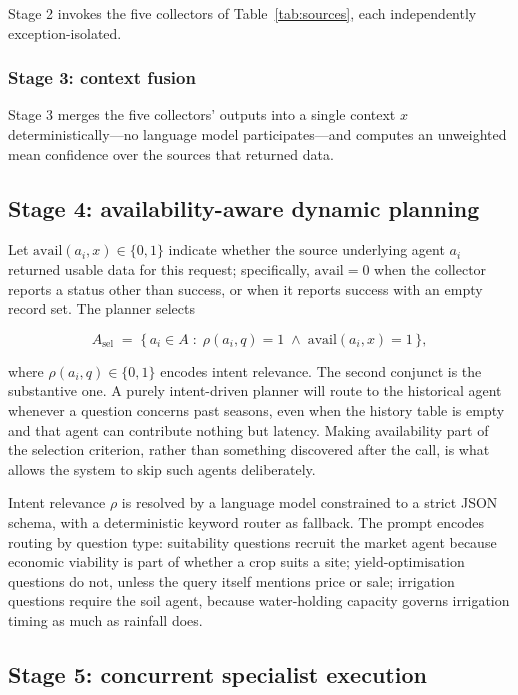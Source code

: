 \documentclass[preprint,12pt]{elsarticle}
\begin{document}
Stage 2 invokes the five collectors of Table~\ref{tab:sources}, each
independently exception-isolated.

\subsubsection{Stage 3: context fusion}

Stage 3 merges the five collectors' outputs into a
single context $x$ deterministically---no language model participates---and
computes an unweighted mean confidence over the sources that returned data.

\subsection{Stage 4: availability-aware dynamic planning}

Let $\mathrm{avail}(a_i,x)\in\{0,1\}$ indicate whether the source
underlying agent $a_i$ returned usable data for this request; specifically,
$\mathrm{avail}=0$ when the collector reports a status other than success,
or when it reports success with an empty record set. The planner selects

\begin{equation}
A_{\mathrm{sel}} \;=\; \{\, a_i \in A \;:\; \rho(a_i, q) = 1 \;\wedge\; \mathrm{avail}(a_i,x)=1 \,\},
\label{eq:routing}
\end{equation}

where $\rho(a_i,q)\in\{0,1\}$ encodes intent relevance. The second
conjunct is the substantive one. A purely intent-driven planner will route
to the historical agent whenever a question concerns past seasons, even
when the history table is empty and that agent can contribute nothing but
latency. Making availability part of the selection criterion, rather than
something discovered after the call, is what allows the system to skip such
agents deliberately.

Intent relevance $\rho$ is resolved by a language model constrained to a
strict JSON schema, with a deterministic keyword router as fallback. The
prompt encodes routing by question type: suitability questions recruit the
market agent because economic viability is part of whether a crop suits a
site; yield-optimisation questions do not, unless the query itself mentions
price or sale; irrigation questions require the soil agent, because
water-holding capacity governs irrigation timing as much as rainfall does.

\subsection{Stage 5: concurrent specialist execution}
\end{document}

